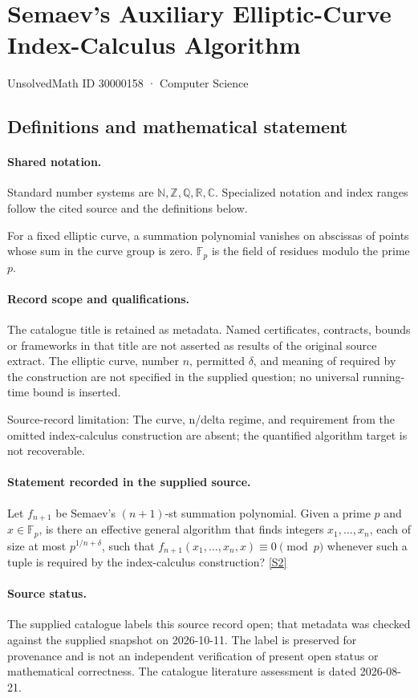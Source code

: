 \documentclass[11pt]{article}
\newcommand{\sref}[2]{\hyperlink{source:#1:#2}{[S#2]}}
\begin{document}
\setcounter{section}{30000157}
\section{Semaev's Auxiliary Elliptic-Curve Index-Calculus Algorithm}\label{30000158}
{\small\sffamily UnsolvedMath ID 30000158 · Computer Science}
\subsection{Definitions and mathematical statement}

\paragraph{Shared notation.}Standard number systems are $\mathbb N,\mathbb Z,\mathbb Q,\mathbb R,\mathbb C$. Specialized notation and index ranges follow the cited source and the definitions below.


For a fixed elliptic curve, a summation polynomial vanishes on abscissas of points whose sum in the curve group is zero. $\mathbb F_p$ is the field of residues modulo the prime $p$.
\paragraph{Record scope and qualifications.}
The catalogue title is retained as metadata. Named certificates, contracts, bounds or frameworks in that title are not asserted as results of the original source extract.
The elliptic curve, number $n$, permitted $\delta$, and meaning of required by the construction are not specified in the supplied question; no universal running-time bound is inserted.

Source-record limitation: The curve, n/delta regime, and requirement from the omitted index-calculus construction are absent; the quantified algorithm target is not recoverable.
\paragraph{Statement recorded in the supplied source.}
Let $f_{n+1}$ be Semaev's $(n+1)$-st summation polynomial. Given a prime $p$ and $x\in\mathbb{F}_p$, is there an effective general algorithm that finds integers $x_1,\ldots,x_n$, each of size at most $p^{1/n+\delta}$, such that $f_{n+1}(x_1,\ldots,x_n,x)\equiv0\pmod p$ whenever such a tuple is required by the index-calculus construction? \sref{30000158}{2}
\paragraph{Source status.}
The supplied catalogue labels this source record open; that metadata was checked against the supplied snapshot on 2026-10-11. The label is preserved for provenance and is not an independent verification of present open status or mathematical correctness. The catalogue literature assessment is dated 2026-08-21.
\end{document}
